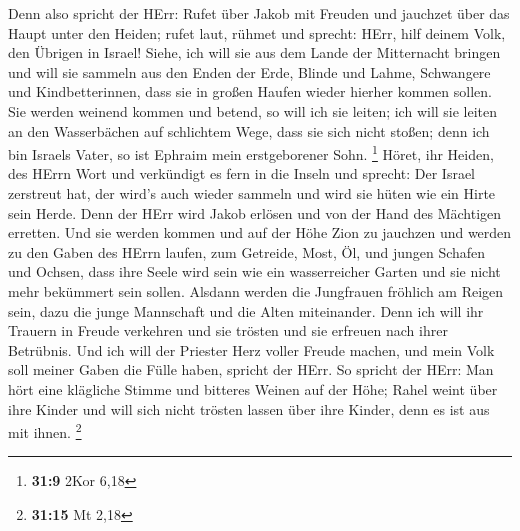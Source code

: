  Denn also spricht der HErr: Rufet über Jakob mit Freuden
und jauchzet über das Haupt unter den Heiden; rufet laut, rühmet und
sprecht: HErr, hilf deinem Volk, den Übrigen in Israel! 
Siehe, ich will sie aus dem Lande der Mitternacht bringen und will sie
sammeln aus den Enden der Erde, Blinde und Lahme, Schwangere und
Kindbetterinnen, dass sie in großen Haufen wieder hierher kommen sollen.
 Sie werden weinend kommen und betend, so will ich sie
leiten; ich will sie leiten an den Wasserbächen auf schlichtem Wege,
dass sie sich nicht stoßen; denn ich bin Israels Vater, so ist Ephraim
mein erstgeborener Sohn. \footnote{\textbf{31:9} 2Kor 6,18}
 Höret, ihr Heiden, des HErrn Wort und verkündigt es fern
in die Inseln und sprecht: Der Israel zerstreut hat, der wird's auch
wieder sammeln und wird sie hüten wie ein Hirte sein Herde.
 Denn der HErr wird Jakob erlösen und von der Hand des
Mächtigen erretten.  Und sie werden kommen und auf der Höhe
Zion zu jauchzen und werden zu den Gaben des HErrn laufen, zum Getreide,
Most, Öl, und jungen Schafen und Ochsen, dass ihre Seele wird sein wie
ein wasserreicher Garten und sie nicht mehr bekümmert sein sollen.
 Alsdann werden die Jungfrauen fröhlich am Reigen sein,
dazu die junge Mannschaft und die Alten miteinander. Denn ich will ihr
Trauern in Freude verkehren und sie trösten und sie erfreuen nach ihrer
Betrübnis.  Und ich will der Priester Herz voller Freude
machen, und mein Volk soll meiner Gaben die Fülle haben, spricht der
HErr.  So spricht der HErr: Man hört eine klägliche Stimme
und bitteres Weinen auf der Höhe; Rahel weint über ihre Kinder und will
sich nicht trösten lassen über ihre Kinder, denn es ist aus mit ihnen.
\footnote{\textbf{31:15} Mt 2,18}

